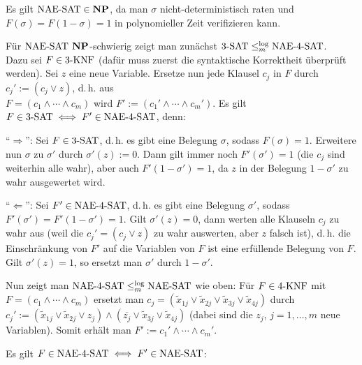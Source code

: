 \begin{Beweis}
    Es gilt $\text{NAE-SAT} \in \mathbf{NP}$, da man $\sigma$ nicht-deterministisch raten und\\
    $F(\sigma) = F(1 - \sigma) = 1$ in polynomieller Zeit verifizieren kann.
    
    Für $\text{NAE-SAT}$ $\mathbf{NP}$-schwierig zeigt man zunächst
    $3\text{-SAT} \le_m^{\log} \text{NAE-}4\text{-SAT}$.\\
    Dazu sei $F \in 3\text{-KNF}$ (dafür muss zuerst die syntaktische Korrektheit überprüft werden).
    Sei $z$ eine neue Variable.
    Ersetze nun jede Klausel $c_j$ in $F$ durch $c_j' := (c_j \lor z)$, d.\,h. aus\\
    $F = (c_1 \land \dotsb \land c_m)$ wird $F' := (c_1' \land \dotsb \land c_m')$.
    Es gilt $F \in 3\text{-SAT} \iff F' \in \text{NAE-}4\text{-SAT}$, denn:
    
    "`$\Rightarrow$"':
    Sei $F \in 3\text{-SAT}$,
    d.\,h. es gibt eine Belegung $\sigma$, sodass $F(\sigma) = 1$.
    Erweitere nun $\sigma$ zu $\sigma'$ durch $\sigma'(z) := 0$.
    Dann gilt immer noch $F'(\sigma') = 1$ (die $c_j$ sind weiterhin alle wahr),
    aber auch $F'(1 - \sigma') = 1$, da $z$ in der Belegung $1 - \sigma'$ zu wahr ausgewertet wird.
    
    "`$\Leftarrow$"':
    Sei $F' \in \text{NAE-}4\text{-SAT}$,
    d.\,h. es gibt eine Belegung $\sigma'$, sodass $F'(\sigma') = F'(1 - \sigma') = 1$.
    Gilt $\sigma'(z) = 0$, dann werten alle Klauseln $c_j$ zu wahr aus
    (weil die $c_j' = (c_j \lor z)$ zu wahr auswerten, aber $z$ falsch ist),
    d.\,h. die Einschränkung von $F'$ auf die Variablen von $F$ ist eine erfüllende Belegung
    von $F$.
    Gilt $\sigma'(z) = 1$, so ersetzt man $\sigma'$ durch $1 - \sigma'$.
    
    Nun zeigt man $\text{NAE-}4\text{-SAT} \le_m^{\log} \text{NAE-SAT}$ wie oben:
    Für $F \in 4\text{-KNF}$ mit $F = (c_1 \land \dotsb \land c_m)$ ersetzt man
    $c_j = (\widetilde{x}_{1j} \lor \widetilde{x}_{2j} \lor
    \widetilde{x}_{3j} \lor \widetilde{x}_{4j})$ durch
    $c_j' := (\widetilde{x}_{1j} \lor \widetilde{x}_{2j} \lor z_j) \land
    (\overline{z_j} \lor \widetilde{x}_{3j} \lor \widetilde{x}_{4j})$
    (dabei sind die $z_j$, $j = 1, \dotsc, m$ neue Variablen).
    Somit erhält man $F' := c_1' \land \dotsb \land c_m'$.
    
    Es gilt $F \in \text{NAE-}4\text{-SAT} \iff F' \in \text{NAE-SAT}$:
    

\end{Beweis}

